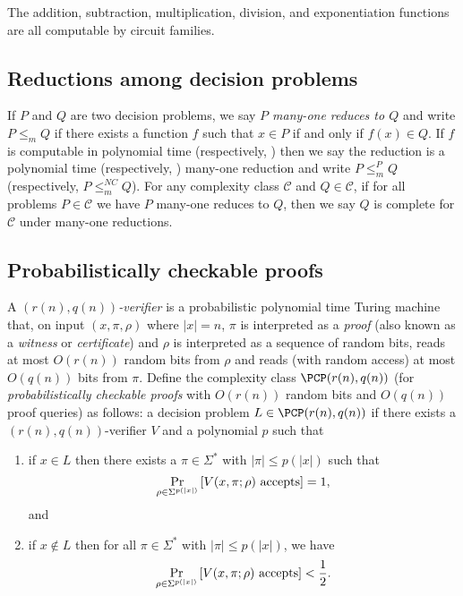 \documentclass[]{article}
\newcommand{\mornt}{\leq_m}
\newcommand{\mor}{\mornt^P}
\newcommand{\mornc}{\mornt^{NC}}
\begin{document}
\begin{lemma}
  The addition, subtraction, multiplication, division, and exponentiation functions are all computable by \NC{} circuit families.
\end{lemma}

\subsection{Reductions among decision problems}

If $P$ and $Q$ are two decision problems, we say \emph{$P$ many-one reduces to $Q$} and write $P \mornt Q$ if there exists a function $f$ such that $x \in P$ if and only if $f(x) \in Q$.
If $f$ is computable in polynomial time (respectively, \NC) then we say the reduction is a polynomial time (respectively, \NC) many-one reduction and write $P \mor Q$ (respectively, $P \mornc Q$).
For any complexity class $\mathcal{C}$ and $Q \in \mathcal{C}$, if for all problems $P \in \mathcal{C}$ we have $P$ many-one reduces to $Q$, then we say $Q$ is complete for $\mathcal{C}$ under many-one reductions.

\subsection{Probabilistically checkable proofs}

A \emph{$(r(n), q(n))$-verifier} is a probabilistic polynomial time Turing machine that, on input $(x, \pi, \rho)$ where $|x| = n$, $\pi$ is interpreted as a \emph{proof} (also known as a \emph{witness} or \emph{certificate}) and $\rho$ is interpreted as a sequence of random bits, reads at most $O(r(n))$ random bits from $\rho$ and reads (with random access) at most $O(q(n))$ bits from $\pi$.
Define the complexity class $\PCP(r(n), q(n))$ (for \emph{probabilistically checkable proofs} with $O(r(n))$ random bits and $O(q(n))$ proof queries) as follows: a decision problem $L \in \PCP(r(n), q(n))$ if there exists a $(r(n), q(n))$-verifier $V$ and a polynomial $p$ such that
\begin{enumerate}
\item
  if $x \in L$ then there exists a $\pi \in \Sigma^*$ with $|\pi| \leq p(|x|)$ such that
  \begin{displaymath}
    \Pr_{\rho \in \Sigma^{p(|x|)}}\left[V(x, \pi; \rho) \textnormal{ accepts}\right] = 1,
  \end{displaymath}
  and
\item
  if $x \notin L$ then for all $\pi \in \Sigma^*$ with $|\pi| \leq p(|x|)$, we have
  \begin{displaymath}
    \Pr_{\rho \in \Sigma^{p(|x|)}}\left[V(x, \pi; \rho) \textnormal{ accepts}\right] < \frac{1}{2}.
  \end{displaymath}
\end{enumerate}
\end{document}
